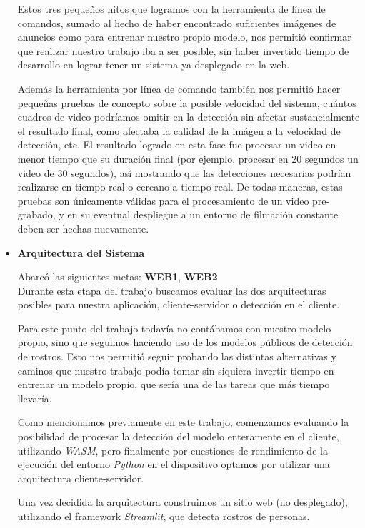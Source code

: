 \documentclass[a4paper]{article}
\begin{document}
\begin{itemize}
Estos tres pequeños hitos que logramos con la herramienta de línea de comandos, sumado al hecho de haber encontrado suficientes imágenes de anuncios como para entrenar nuestro propio modelo, nos permitió confirmar que realizar nuestro trabajo iba a ser posible, sin haber invertido tiempo de desarrollo en lograr tener un sistema ya desplegado en la web.

Además la herramienta por línea de comando también nos permitió hacer pequeñas pruebas de concepto sobre la posible velocidad del sistema, cuántos cuadros de video podríamos omitir en la detección sin afectar sustancialmente el resultado final, como afectaba la calidad de la imágen a la velocidad de detección, etc. El resultado logrado en esta fase fue procesar un video en menor tiempo que su duración final (por ejemplo, procesar en 20 segundos un video de 30 segundos), así mostrando que las detecciones necesarias podrían realizarse en tiempo real o cercano a tiempo real. De todas maneras, estas pruebas son únicamente válidas para el procesamiento de un video pre-grabado, y en su eventual despliegue a un entorno de filmación constante deben ser hechas nuevamente.

\item \textbf{Arquitectura del Sistema}

Abarcó las siguientes metas: \textbf{WEB1}, \textbf{WEB2} \\

Durante esta etapa del trabajo buscamos evaluar las dos arquitecturas posibles para nuestra aplicación, cliente-servidor o detección en el cliente.

Para este punto del trabajo todavía no contábamos con nuestro modelo propio, sino que seguimos haciendo uso de los modelos públicos de detección de rostros. Esto nos permitió seguir probando las distintas alternativas y caminos que nuestro trabajo podía tomar sin siquiera invertir tiempo en entrenar un modelo propio, que sería una de las tareas que más tiempo llevaría.

Como mencionamos previamente en este trabajo, comenzamos evaluando la posibilidad de procesar la detección del modelo enteramente en el cliente, utilizando \textit{WASM}, pero finalmente por cuestiones de rendimiento de la ejecución del entorno \textit{Python} en el dispositivo optamos por utilizar una arquitectura cliente-servidor.

Una vez decidida la arquitectura construimos un sitio web (no desplegado), utilizando el framework \textit{Streamlit}, que detecta rostros de personas.


\end{itemize}
\end{document}
